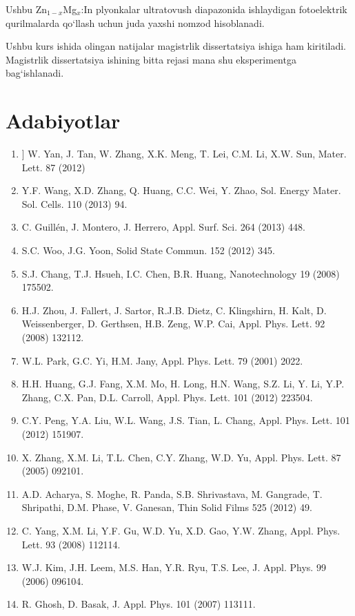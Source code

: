 \documentclass[14pt]{article}
\begin{document}
	Ushbu Zn$_{1-x}$Mg$_{x}$:In plyonkalar ultratovush diapazonida ishlaydigan fotoelektrik qurilmalarda qo`llash uchun juda yaxshi nomzod hisoblanadi.
	
	Ushbu kurs ishida olingan natijalar magistrlik dissertatsiya ishiga ham kiritiladi. Magistrlik dissertatsiya ishining bitta rejasi mana shu eksperimentga bag`ishlanadi.
	
	\newpage
	\section{Adabiyotlar}
	\begin{enumerate}
		\item ] W. Yan, J. Tan, W. Zhang, X.K. Meng, T. Lei, C.M. Li, X.W. Sun, Mater. Lett. 87 (2012) 
		\item  Y.F. Wang, X.D. Zhang, Q. Huang, C.C. Wei, Y. Zhao, Sol. Energy Mater. Sol. Cells. 110 (2013) 94.
		\item  C. Guillén, J. Montero, J. Herrero, Appl. Surf. Sci. 264 (2013) 448.
		\item  S.C. Woo, J.G. Yoon, Solid State Commun. 152 (2012) 345.
		\item  S.J. Chang, T.J. Hsueh, I.C. Chen, B.R. Huang, Nanotechnology 19 (2008) 175502.
		\item  H.J. Zhou, J. Fallert, J. Sartor, R.J.B. Dietz, C. Klingshirn, H. Kalt, D. Weissenberger, D. Gerthsen, H.B. Zeng, W.P. Cai, Appl.
		Phys. Lett. 92 (2008) 132112.
		\item  W.L. Park, G.C. Yi, H.M. Jany, Appl. Phys. Lett. 79 (2001) 2022.
		\item  H.H. Huang, G.J. Fang, X.M. Mo, H. Long, H.N. Wang, S.Z. Li, Y. Li, Y.P. Zhang, C.X. Pan, D.L. Carroll, Appl. Phys. Lett. 101
		(2012) 223504.
		\item  C.Y. Peng, Y.A. Liu, W.L. Wang, J.S. Tian, L. Chang, Appl. Phys. Lett. 101 (2012) 151907.
		\item  X. Zhang, X.M. Li, T.L. Chen, C.Y. Zhang, W.D. Yu, Appl. Phys. Lett. 87 (2005) 092101.
		\item  A.D. Acharya, S. Moghe, R. Panda, S.B. Shrivastava, M. Gangrade, T. Shripathi, D.M. Phase, V. Ganesan, Thin Solid Films 525
		(2012) 49.
		\item  C. Yang, X.M. Li, Y.F. Gu, W.D. Yu, X.D. Gao, Y.W. Zhang, Appl. Phys. Lett. 93 (2008) 112114.
		\item  W.J. Kim, J.H. Leem, M.S. Han, Y.R. Ryu, T.S. Lee, J. Appl. Phys. 99 (2006) 096104.
		\item  R. Ghosh, D. Basak, J. Appl. Phys. 101 (2007) 113111.

\end{enumerate}
\end{document}
